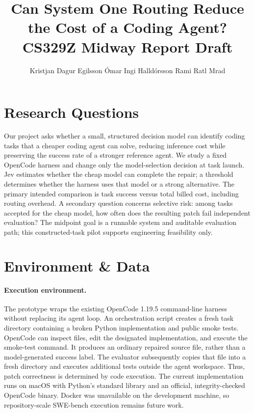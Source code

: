 \documentclass{article}
\title{Can System One Routing Reduce the Cost of a Coding Agent?\\CS329Z Midway Report Draft}
\author{Kristjan Dagur Egilsson \And \'Omar Ingi Halld\'orsson \And Rami Ratl Mrad}
\begin{document}
\maketitle
{}

\section{Research Questions}

Our project asks whether a small, structured decision model can identify coding tasks that a cheaper coding agent can solve, reducing inference cost while preserving the success rate of a stronger reference agent. We study a fixed OpenCode harness and change only the model-selection decision at task launch. Jev estimates whether the cheap model can complete the repair; a threshold determines whether the harness uses that model or a strong alternative. The primary intended comparison is task success versus total billed cost, including routing overhead. A secondary question concerns selective risk: among tasks accepted for the cheap model, how often does the resulting patch fail independent evaluation? The midpoint goal is a runnable system and auditable evaluation path; this constructed-task pilot supports engineering feasibility only.

\section{Environment \& Data}

\paragraph{Execution environment.}
The prototype wraps the existing OpenCode 1.19.5 command-line harness without replacing its agent loop. An orchestration script creates a fresh task directory containing a broken Python implementation and public smoke tests. OpenCode can inspect files, edit the designated implementation, and execute the smoke-test command. It produces an ordinary repaired source file, rather than a model-generated success label. The evaluator subsequently copies that file into a fresh directory and executes additional tests outside the agent workspace. Thus, patch correctness is determined by code execution. The current implementation runs on macOS with Python's standard library and an official, integrity-checked OpenCode binary. Docker was unavailable on the development machine, so repository-scale SWE-bench execution remains future work.
\end{document}
